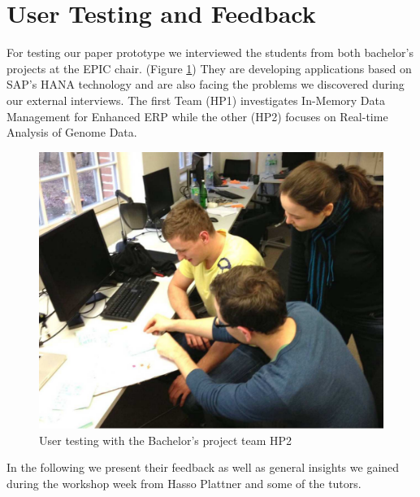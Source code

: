 
\section{User Testing and Feedback}
\label{sec:USER_TESTING}

For testing our paper prototype we interviewed the students from both bachelor's projects at the EPIC chair. (Figure \ref{fig:user_testing}) They are developing applications based on SAP's HANA technology and are also facing the problems we discovered during our external interviews. The first Team (HP1) investigates In-Memory Data Management for Enhanced ERP while the other (HP2) focuses on Real-time Analysis of Genome Data. \\

\begin{figure}
\begin{centering}
    \includegraphics[width=1.0\linewidth]{images/user_testing}
    \caption{User testing with the Bachelor's project team HP2}
    \label{fig:user_testing}
\end{centering}
\end{figure}

In the following we present their feedback as well as general insights we gained during the workshop week from Hasso Plattner and some of the tutors.

